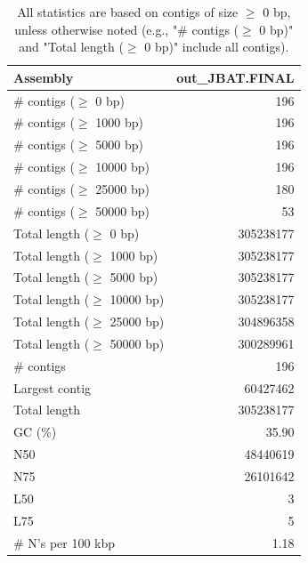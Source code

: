 \documentclass[12pt,a4paper]{article}
\begin{document}
\begin{table}[ht]
\begin{center}
\caption{All statistics are based on contigs of size $\geq$ 0 bp, unless otherwise noted (e.g., "\# contigs ($\geq$ 0 bp)" and "Total length ($\geq$ 0 bp)" include all contigs).}
\begin{tabular}{|l*{1}{|r}|}
\hline
Assembly & out\_JBAT.FINAL \\ \hline
\# contigs ($\geq$ 0 bp) & 196 \\ \hline
\# contigs ($\geq$ 1000 bp) & 196 \\ \hline
\# contigs ($\geq$ 5000 bp) & 196 \\ \hline
\# contigs ($\geq$ 10000 bp) & 196 \\ \hline
\# contigs ($\geq$ 25000 bp) & 180 \\ \hline
\# contigs ($\geq$ 50000 bp) & 53 \\ \hline
Total length ($\geq$ 0 bp) & 305238177 \\ \hline
Total length ($\geq$ 1000 bp) & 305238177 \\ \hline
Total length ($\geq$ 5000 bp) & 305238177 \\ \hline
Total length ($\geq$ 10000 bp) & 305238177 \\ \hline
Total length ($\geq$ 25000 bp) & 304896358 \\ \hline
Total length ($\geq$ 50000 bp) & 300289961 \\ \hline
\# contigs & 196 \\ \hline
Largest contig & 60427462 \\ \hline
Total length & 305238177 \\ \hline
GC (\%) & 35.90 \\ \hline
N50 & 48440619 \\ \hline
N75 & 26101642 \\ \hline
L50 & 3 \\ \hline
L75 & 5 \\ \hline
\# N's per 100 kbp & 1.18 \\ \hline
\end{tabular}
\end{center}
\end{table}
\end{document}

